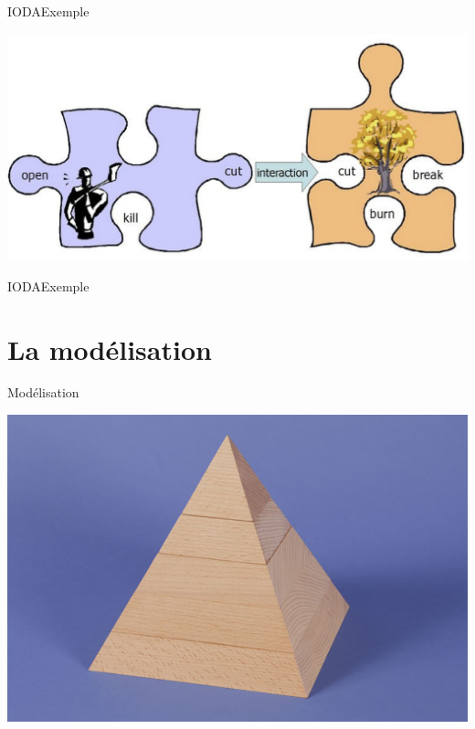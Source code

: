 \documentclass[t, 10pt]{beamer}
\begin{document}
	\begin{frame}[c]{IODA}{Exemple}
		\begin{center}
			\includegraphics[scale=0.4]{img/moteur_ioda_explications.png}
		\end{center}
	\end{frame}
	
	\begin{frame}[c]{IODA}{Exemple}
		\begin{figure}[htbp]
		\makebox[\textwidth]{\hrulefill}{
		\small
		
		\normalsize}
		\end{figure}
	\end{frame}
	
	\section{La modélisation}
	
	\begin{frame}[c]{Modélisation}
		\begin{center}
			\includegraphics[scale=0.33]{img/pyramide.jpeg}
		\end{center}
	\end{frame}
	
\end{document}
